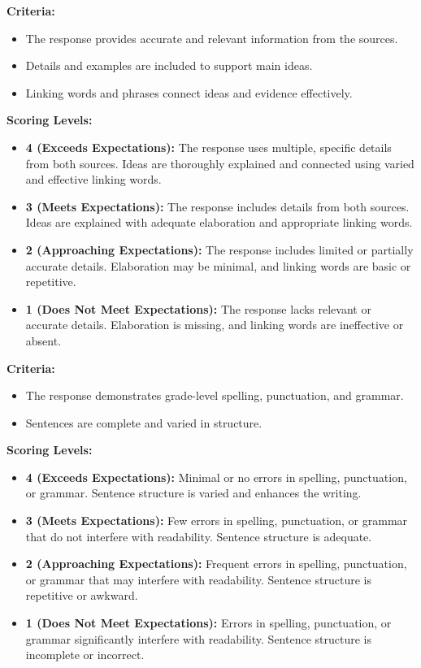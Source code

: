 \documentclass[12pt]{article}
\begin{document}
\begin{tcolorbox}[colframe=black!60, colback=white, title=Evidence and Elaboration]
\textbf{Criteria:}
\begin{itemize}
    \item The response provides accurate and relevant information from the sources.
    \item Details and examples are included to support main ideas.
    \item Linking words and phrases connect ideas and evidence effectively.
\end{itemize}
\textbf{Scoring Levels:}
\begin{itemize}[label=\textbullet]
    \item \textbf{4 (Exceeds Expectations):} The response uses multiple, specific details from both sources. Ideas are thoroughly explained and connected using varied and effective linking words.
    \item \textbf{3 (Meets Expectations):} The response includes details from both sources. Ideas are explained with adequate elaboration and appropriate linking words.
    \item \textbf{2 (Approaching Expectations):} The response includes limited or partially accurate details. Elaboration may be minimal, and linking words are basic or repetitive.
    \item \textbf{1 (Does Not Meet Expectations):} The response lacks relevant or accurate details. Elaboration is missing, and linking words are ineffective or absent.
\end{itemize}
\end{tcolorbox}

\begin{tcolorbox}[colframe=black!60, colback=white, title=Conventions]
\textbf{Criteria:}
\begin{itemize}
    \item The response demonstrates grade-level spelling, punctuation, and grammar.
    \item Sentences are complete and varied in structure.
\end{itemize}
\textbf{Scoring Levels:}
\begin{itemize}[label=\textbullet]
    \item \textbf{4 (Exceeds Expectations):} Minimal or no errors in spelling, punctuation, or grammar. Sentence structure is varied and enhances the writing.
    \item \textbf{3 (Meets Expectations):} Few errors in spelling, punctuation, or grammar that do not interfere with readability. Sentence structure is adequate.
    \item \textbf{2 (Approaching Expectations):} Frequent errors in spelling, punctuation, or grammar that may interfere with readability. Sentence structure is repetitive or awkward.
    \item \textbf{1 (Does Not Meet Expectations):} Errors in spelling, punctuation, or grammar significantly interfere with readability. Sentence structure is incomplete or incorrect.
\end{itemize}
\end{tcolorbox}
\end{document}
